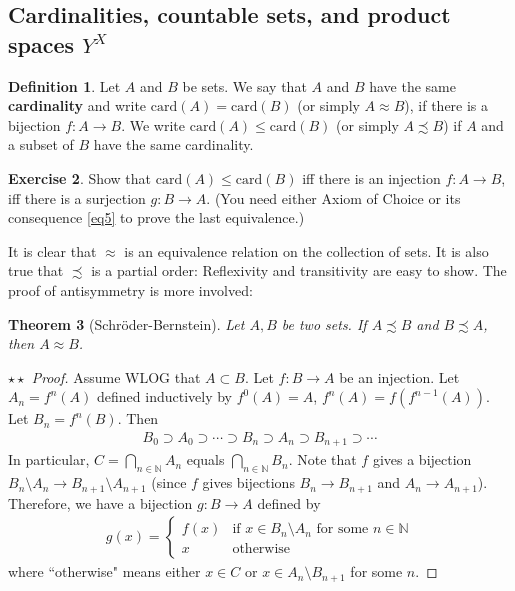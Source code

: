 \documentclass[12pt,b5paper,notitlepage]{article}
\theoremstyle{definition}
\newtheorem{df}{Definition}[section]
\newtheorem{exe}[df]{Exercise}
\theoremstyle{plain}
\newtheorem{thm}[df]{Theorem}
\newcommand{\Nbb}{\mathbb N}
\newcommand{\card}{\mathrm{card}}
\numberwithin{equation}{section}
\begin{document}
\subsection{Cardinalities, countable sets, and product spaces $Y^X$}\label{lb4}


\begin{df}
Let $A$ and $B$ be sets. We say that $A$ and $B$ have the same \textbf{cardinality} \index{00@Cardinality $\card(A)$} and write $\card(A)=\card(B)$ (or simply $A\approx B$), if there is a bijection $f:A\rightarrow B$. We write $\card(A)\leq\card(B)$ (or simply $A\precsim B$) if $A$ and a subset of $B$ have the same cardinality. 
\end{df}



\begin{exe}\label{lb9}
Show that $\card(A)\leq\card(B)$ iff there is an injection $f:A\rightarrow B$, iff there is a surjection $g:B\rightarrow A$. (You need either Axiom of Choice or its consequence \eqref{eq5} to prove the last equivalence.)
\end{exe}

It is clear that $\approx$ is an equivalence relation on the collection of sets. It is also true that $\precsim$ is a partial order: Reflexivity and transitivity are easy to show. The proof of antisymmetry is more involved:



\begin{thm}[Schr\"oder-Bernstein]\label{lb8}
Let $A,B$ be two sets. If $A\precsim B$ and $B\precsim A$, then $A\approx B$.
\end{thm}

\begin{proof}[$\star\star$ Proof]
Assume WLOG that $A\subset B$. Let $f:B\rightarrow A$ be an injection. Let $A_n=f^n(A)$ defined inductively by $f^0(A)=A$, $f^n(A)=f(f^{n-1}(A))$. Let $B_n=f^n(B)$. Then
\begin{align*}
B_0\supset A_0\supset \cdots\supset B_n\supset A_n\supset B_{n+1}\supset\cdots
\end{align*}
In particular, $C=\bigcap_{n\in\Nbb}A_n$ equals $\bigcap_{n\in\Nbb}B_n$. Note that $f$ gives a bijection $B_n\setminus A_n\rightarrow B_{n+1}\setminus A_{n+1}$ (since $f$ gives bijections $B_n\rightarrow B_{n+1}$ and $A_n\rightarrow A_{n+1}$). Therefore, we have a bijection $g:B\rightarrow A$ defined by
\begin{gather*}
g(x)=\left\{
{\begin{array}{ll}
f(x)&\text{if $x\in B_n\setminus A_n$ for some $n\in\Nbb$}\\[0.5ex]
x&\text{otherwise}
\end{array}}
\right.
\end{gather*}
where ``otherwise" means either $x\in C$ or $x\in A_n\setminus B_{n+1}$ for some $n$.
\end{proof}
\end{document}
